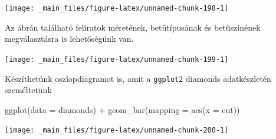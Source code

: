 \documentclass[
]{book}
\newenvironment{Shaded}{\begin{snugshade}}{\end{snugshade}}
\newcommand{\AttributeTok}[1]{\textcolor[rgb]{0.77,0.63,0.00}{#1}}
\newcommand{\DecValTok}[1]{\textcolor[rgb]{0.00,0.00,0.81}{#1}}
\newcommand{\FunctionTok}[1]{\textcolor[rgb]{0.00,0.00,0.00}{#1}}
\newcommand{\NormalTok}[1]{#1}
\newcommand{\SpecialCharTok}[1]{\textcolor[rgb]{0.00,0.00,0.00}{#1}}
\newcommand{\StringTok}[1]{\textcolor[rgb]{0.31,0.60,0.02}{#1}}
\begin{document}
\begin{center}\texttt{[image: \_main\_files/figure-latex/unnamed-chunk-198-1]} \end{center}

Az ábrán található feliratok méretének, betűtípusának és betűszínének
megválasztásra is lehetőségünk van.

\begin{Shaded}
\end{Shaded}

\begin{center}\texttt{[image: \_main\_files/figure-latex/unnamed-chunk-199-1]} \end{center}

Készíthetünk oszlopdiagramot is, amit a \texttt{ggplot2} diamonds
adatkészletén személtetünk

\begin{Shaded}
\begin{Highlighting}[]
\FunctionTok{ggplot}\NormalTok{(}\AttributeTok{data =}\NormalTok{ diamonds) }\SpecialCharTok{+}
  \FunctionTok{geom\_bar}\NormalTok{(}\AttributeTok{mapping =} \FunctionTok{aes}\NormalTok{(}\AttributeTok{x =}\NormalTok{ cut))}
\end{Highlighting}
\end{Shaded}

\begin{center}\texttt{[image: \_main\_files/figure-latex/unnamed-chunk-200-1]} \end{center}
\end{document}
